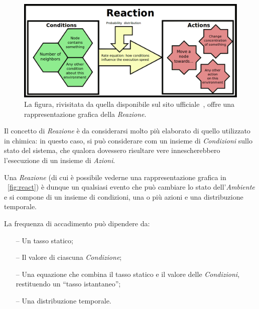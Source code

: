 \begin{description}
                \begin{figure}[htbp]\label{fig:react}
                    \centering
                    \includegraphics[scale=.35]{img/reaction}
                    \caption{%
                        La figura, rivisitata da quella disponibile sul sito ufficiale~\cite{alchemistWeb}, offre una rappresentazione grafica della \emph{Reazione}.
                    }
                \end{figure}

                \item[\engEmph{Reaction}\label{itm:react}]
                    Il concetto di \emph{Reazione} è da considerarsi molto più elaborato di quello utilizzato in chimica: in questo caso, si può considerare com un insieme di \emph{Condizioni} sullo stato del sistema, che qualora dovessero risultare vere innescherebbero l'esecuzione di un insieme di \emph{Azioni}.

                    Una \emph{Reazione} (di cui è possibile vederne una rappresentazione grafica in \figurename~\vref{fig:react}) è dunque un qualsiasi evento che può cambiare lo stato dell’\emph{Ambiente} e si compone di un insieme di condizioni, una o più azioni e una distribuzione temporale.

                    La frequenza di accadimento può dipendere da:
                    \begin{itemize}
                        \item[--] Un tasso statico;
                        \item[--] Il valore di ciascuna \emph{Condizione};
                        \item[--] Una equazione che combina il tasso statico e il valore delle \emph{Condizioni}, restituendo un ``tasso istantaneo'';
                        \item[--] Una distribuzione temporale.
                    \end{itemize}


\end{description}
